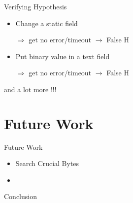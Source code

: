 \documentclass{beamer}
\newcounter{m} %
\newcounter{c} %
\begin{document}
  \begin{frame}{Verifying Hypothesis}
  \begin{itemize}
  \item Change a static field

  $\Rightarrow$ get no error/timeout $\rightarrow$ False H
  
  \bigskip

  \item Put binary value in a text field
  
  $\Rightarrow$ get no error/timeout $\rightarrow$ False H
  \end{itemize}
  
  and a lot more !!!
  
  \end{frame}


\section{Future Work}
\begin{frame}

	\tableofcontents[currentsection]
\end{frame}

\begin{frame}{Future Work}
\begin{itemize}
\item Search Crucial Bytes 
\item 
\end{itemize}

\end{frame}

\begin{frame}{Conclusion}

\end{frame}
\end{document}
